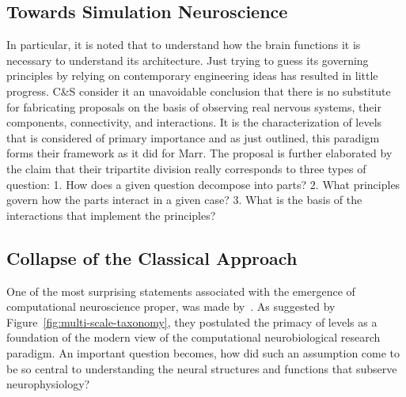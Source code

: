 \documentclass[11pt,3p,twocolumn]{JMN}
\begin{document}
\subsection{Towards Simulation Neuroscience}


In particular, it is noted that to understand how the brain functions it is necessary to understand its architecture. Just trying to guess its governing principles by relying on contemporary engineering ideas has resulted in little progress. C\&S consider it an unavoidable conclusion that there is no substitute for fabricating proposals on the basis of observing real nervous systems, their components, connectivity, and interactions. It is the characterization of levels that is considered of primary importance and as just outlined, this paradigm forms their framework as it did for Marr. The proposal is further elaborated by the claim that their tripartite division really corresponds to three types of question: 1. How does a given question decompose into parts? 2. What principles govern how the parts interact in a given case? 3. What is the basis of the interactions that implement the principles?

\subsection{Collapse of the Classical Approach}

One of the most surprising statements associated with the emergence of computational neuroscience proper, was made by~\citet[][C\&S]{Churchland:1992uq}. As suggested by Figure~\ref{fig:multi-scale-taxonomy}, they postulated the primacy of levels as a foundation of the modern view of the computational neurobiological research paradigm. An important question becomes, how did such an assumption come to be so central to understanding the neural structures and functions that subserve neurophysiology?
\end{document}
